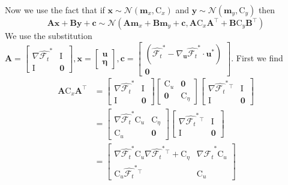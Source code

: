 \documentclass{article}
\newcommand{\vv}[1]{\boldsymbol{#1}}
\newcommand{\mm}[1]{\mathrm{#1}}
\newcommand{\dist}[1]{\mathcal{#1}}
\begin{document}
Now we use the fact that if \(\vv{x} \sim \dist{N}\left(\mathbf{m}_{x}, \mm{C}_{x}\right)\) and \(\mathbf{y} \sim \dist{N}\left(\mathbf{m}_{y}, \mm{C}_{y}\right)\) then
\[
\mathbf{A x}+\mathbf{B y}+\mathbf{c} \sim \dist{N}\left(\mathbf{A m}_{x}+\mathbf{B} \mathbf{m}_{y}+\mathbf{c}, \mathbf{A} \mm{C}_{x} \mathbf{A}^{\top}+\mathbf{B} \mm{C}_{y} \mathbf{B}^{\top}\right)
\]
We use the substitution \(\mathbf{A}=\begin{bmatrix}
  \nabla \widehat{\mathcal{F}_{t}}^*& \mm{I}\\
  \mm{I} & \mathbf{0}
\end{bmatrix},\vv{x}=\begin{bmatrix}
  \vv{u} \\ \vv{\eta}
\end{bmatrix},\vv{c}=\begin{bmatrix}
  \left(\widehat{\mathcal{F}_{t}}^* -\nabla_{\vv{u}} \widehat{\mathcal{F}_{t}}^*\cdot \vv{u}^*\right)\\ \mathbf{0}
\end{bmatrix}\).
First we find
\begin{align}
\mathbf{A}\vv{\mm{C}}_{x}\mathbf{A}^{\top}
&=\begin{bmatrix}
  \nabla \widehat{\mathcal{F}_{t}}^*& \mm{I}\\
  \mm{I} & \mathbf{0}
\end{bmatrix}\begin{bmatrix}
  \vv{\mm{C}}_u & \vv{0} \\\vv{0} & \vv{\mm{C}}_{\eta}
\end{bmatrix}
\begin{bmatrix}
  \nabla \widehat{\mathcal{F}_{t}}^*{}^\top& \mm{I}\\
  \mm{I} & \mathbf{0}
\end{bmatrix}\\
&=\begin{bmatrix}
  \nabla \widehat{\mathcal{F}_{t}}^* \vv{\mm{C}}_u & \vv{\mm{C}}_{\eta}\\
  \vv{\mm{C}}_{u} & \mathbf{0}
\end{bmatrix}
\begin{bmatrix}
  \nabla \widehat{\mathcal{F}_{t}}^*{}^\top& \mm{I}\\
  \mm{I} & \mathbf{0}
\end{bmatrix}\\
&=\begin{bmatrix}
  \nabla \widehat{\mathcal{F}_{t}}^* \vv{\mm{C}}_u\nabla \widehat{\mathcal{F}_{t}}^*{}^\top +\mm{C}_{\eta} & \nabla \widehat{\mathcal{F}_{t}}^* \mm{C}_u\\
  \mm{C}_{u}\widehat{\mathcal{F}_{t}}^*{}^\top & \mm{C}_{u}
\end{bmatrix}
\end{align}
\end{document}
